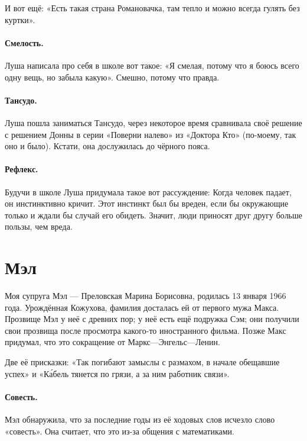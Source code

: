 \documentclass{book}
\begin{document}
И вот ещё: «Есть такая страна Романовачка, там тепло и можно всегда гулять без куртки».

\paragraph{Смелость.} Луша написала про себя в школе вот такое:
«Я смелая, потому что я боюсь всего одну вещь, но забыла какую».
Смешно, потому что правда.

\paragraph{Тансудо.} Луша пошла заниматься Тансудо, через некоторое время сравнивала своё решение с решением Донны в серии «Поверни налево» из «Доктора Кто» (по-моему, так оно и было).
Кстати, она дослужилась до чёрного пояса.

\paragraph{Рефлекс.} Будучи в школе Луша придумала такое вот рассуждение: 
Когда человек падает, он инстинктивно кричит.
Этот инстинкт был бы вреден, если бы окружающие только и ждали бы случай его обидеть.
Значит, люди приносят друг другу больше пользы, чем вреда.


\section*{Мэл}

Моя супруга Мэл --- Преловская Марина Борисовна, родилась 13 января 1966 года.
Урождённая Кожухова, фамилия досталась ей от первого мужа Макса.
Прозвище Мэл у неё с древних пор;
у неё есть ещё подружка Сэм; они получили свои прозвища после просмотра какого-то иностранного фильма.
Позже Макс придумал, что это сокращение от Маркс---Энгельс---Ленин.

Две её присказки:
«Так погибают замыслы с размахом, в начале обещавшие успех»
и «К\'{а}бель тянется по грязи, а за ним работник связи».

\paragraph{Совесть.}
Мэл обнаружила, что за последние годы из её ходовых слов исчезло слово «совесть».
Она считает, что это из-за общения с математиками. 
\end{document}

